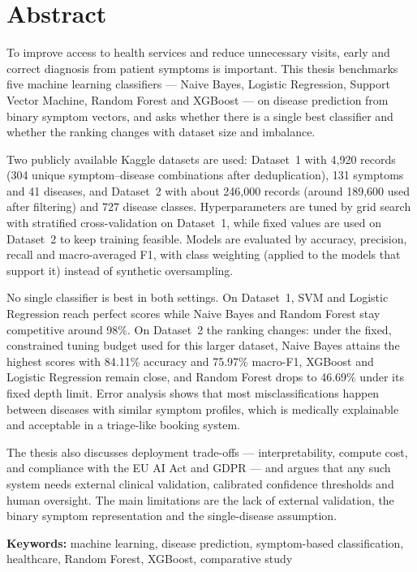 \chapter*{Abstract}

To improve access to health services and reduce unnecessary visits, early and correct diagnosis from patient symptoms is important. This thesis benchmarks five machine learning classifiers --- Naive Bayes, Logistic Regression, Support Vector Machine, Random Forest and XGBoost --- on disease prediction from binary symptom vectors, and asks whether there is a single best classifier and whether the ranking changes with dataset size and imbalance.

Two publicly available Kaggle datasets are used: Dataset~1 with 4,920 records (304 unique symptom--disease combinations after deduplication), 131 symptoms and 41 diseases, and Dataset~2 with about 246,000 records (around 189,600 used after filtering) and 727 disease classes. Hyperparameters are tuned by grid search with stratified cross-validation on Dataset~1, while fixed values are used on Dataset~2 to keep training feasible. Models are evaluated by accuracy, precision, recall and macro-averaged F1, with class weighting (applied to the models that support it) instead of synthetic oversampling.

No single classifier is best in both settings. On Dataset~1, SVM and Logistic Regression reach perfect scores while Naive Bayes and Random Forest stay competitive around 98\%. On Dataset~2 the ranking changes: under the fixed, constrained tuning budget used for this larger dataset, Naive Bayes attains the highest scores with 84.11\% accuracy and 75.97\% macro-F1, XGBoost and Logistic Regression remain close, and Random Forest drops to 46.69\% under its fixed depth limit. Error analysis shows that most misclassifications happen between diseases with similar symptom profiles, which is medically explainable and acceptable in a triage-like booking system.

The thesis also discusses deployment trade-offs --- interpretability, compute cost, and compliance with the EU AI Act and GDPR --- and argues that any such system needs external clinical validation, calibrated confidence thresholds and human oversight. The main limitations are the lack of external validation, the binary symptom representation and the single-disease assumption.

\vspace{0.5cm}
\noindent\textbf{Keywords:} machine learning, disease prediction, symptom-based classification, healthcare, Random Forest, XGBoost, comparative study
